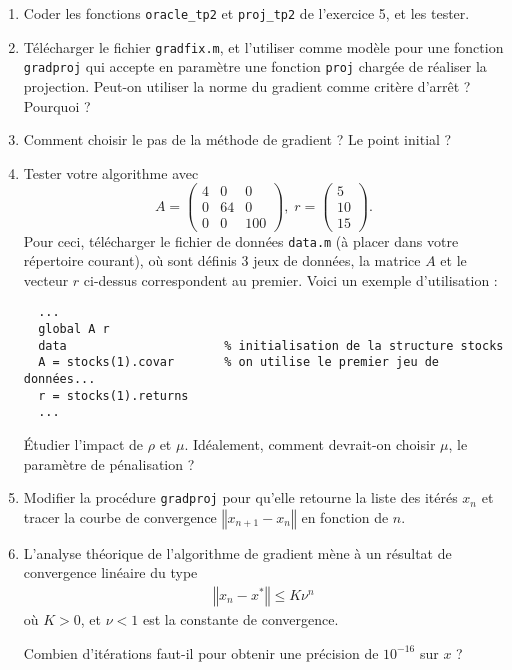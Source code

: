 \documentclass[10pt,a4paper,fleqn]{report}
\begin{document}
\begin{enumerate}
\item Coder les fonctions \verb+oracle_tp2+ et \verb+proj_tp2+
    de l'exercice 5, et les tester.
\item Télécharger le fichier \verb+gradfix.m+, et l'utiliser comme
  modèle pour une fonction \verb+gradproj+ qui accepte en paramètre
  une fonction \verb+proj+ chargée de réaliser la projection.
  Peut-on utiliser la norme du gradient comme critère d'arrêt ? Pourquoi ?
\item Comment choisir le pas de la méthode de gradient ? Le point
  initial ?
\item Tester votre algorithme avec
    \[A =
  \begin{pmatrix}
    4&0&0\\0&64&0\\0&0&100
  \end{pmatrix},\;r =
  \begin{pmatrix}
    5\\10\\15
  \end{pmatrix}.\]
  Pour ceci, télécharger le fichier de données \verb+data.m+ (à placer dans votre répertoire
  courant), où sont définis 3 jeux de données, la matrice $A$ et le vecteur $r$ ci-dessus
  correspondent au premier. Voici un exemple d'utilisation :
  \begin{verbatim}
  ...
  global A r
  data                      % initialisation de la structure stocks
  A = stocks(1).covar       % on utilise le premier jeu de données...
  r = stocks(1).returns
  ...
  \end{verbatim}

  Étudier l'impact de $\rho$ et $\mu$. Idéalement, comment devrait-on choisir $\mu$, le paramètre de
  pénalisation ?
\item Modifier la procédure \verb+gradproj+ pour qu'elle retourne la
  liste des itérés $x_{n}$ et tracer la courbe de convergence
  $\left\Vert x_{n+1} - x_{n}\right\Vert$ en fonction de $n$.
\item L'analyse théorique de l'algorithme de gradient mène à un
  résultat de convergence linéaire du type
  \begin{align*}
    \left\Vert x_{n} - x^{*}\right\Vert \leq K \nu^{n}
  \end{align*}
  où $K > 0$, et $\nu < 1$ est la constante de convergence.

  Combien d'itérations faut-il pour obtenir une précision de
  $10^{-16}$ sur $x$ ?


\end{enumerate}
\end{document}
